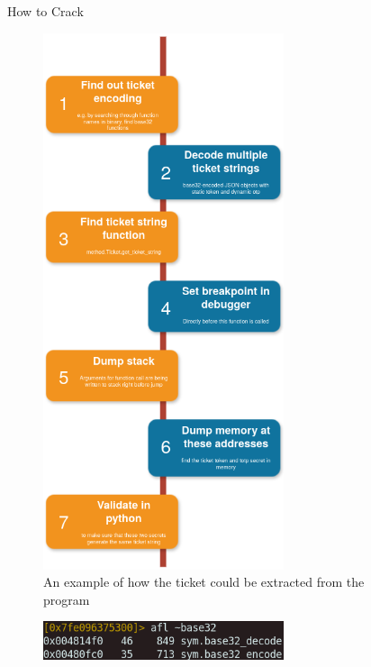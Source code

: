 \documentclass[final,dvipsnames]{beamer}
\newlength{\sepwidth}
\newlength{\colwidth}
\newcommand{\separatorcolumn}{\begin{column}{\sepwidth}\end{column}}
\begin{document}
\begin{frame}[t, fragile]
\begin{columns}[t]
\begin{column}{\colwidth}
\end{column}

\separatorcolumn

\begin{column}{\colwidth}
    \begin{block}{How to Crack}
        \begin{figure}[h]
            \centering
            \includegraphics[width=0.7\textwidth]{figures/HackingFlow.png}
            \caption{An example of how the ticket could be extracted from the program}
            \label{fig:HackingFlow}
        \end{figure}
        \begin{figure}[h]
            \centering
            \includegraphics[width=0.7\textwidth]{figures/Hacking_step_1.png}

\end{figure}
\end{block}
\end{column}
\end{columns}
\end{frame}
\end{document}
